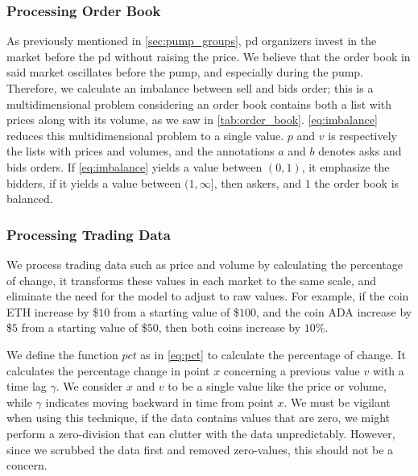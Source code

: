 \subsubsection{Processing Order Book}
As previously mentioned in \autoref{sec:pump_groups}, \ac{pd} organizers invest in the market before the \ac{pd} without raising the price. We believe that the order book in said market oscillates before the pump, and especially during the pump. Therefore, we calculate an imbalance between sell and bids order; this is a multidimensional problem considering an order book contains both a list with prices along with its volume, as we saw in \autoref{tab:order_book}. \autoref{eq:imbalance} reduces this multidimensional problem to a single value. $p$ and $v$ is respectively the lists with prices and volumes, and the annotations $a$ and $b$ denotes asks and bids orders. If \autoref{eq:imbalance} yields a value between $(0,1)$, it emphasize the bidders, if it yields a value between $(1, \infty]$, then askers, and $1$ the order book is balanced.



\subsubsection{Processing Trading Data}
We process trading data such as price and volume by calculating the percentage of change, it transforms these values in each market to the same scale, and eliminate the need for the model to adjust to raw values. For example, if the coin ETH increase by \$$10$ from a starting value of \$$100$, and the coin ADA increase by \$$5$ from a starting value of \$$50$, then both coins increase by $10$\%.



We define the function $pct$ as in \autoref{eq:pct} to calculate the percentage of change. It calculates the percentage change in point $x$ concerning a previous value $v$ with a time lag $\gamma$. We consider $x$ and $v$ to be a single value like the price or volume, while $\gamma$ indicates moving backward in time from point $x$. We must be vigilant when using this technique, if the data contains values that are zero, we might perform a zero-division that can clutter with the data unpredictably. However, since we scrubbed the data first and removed zero-values, this should not be a concern.

